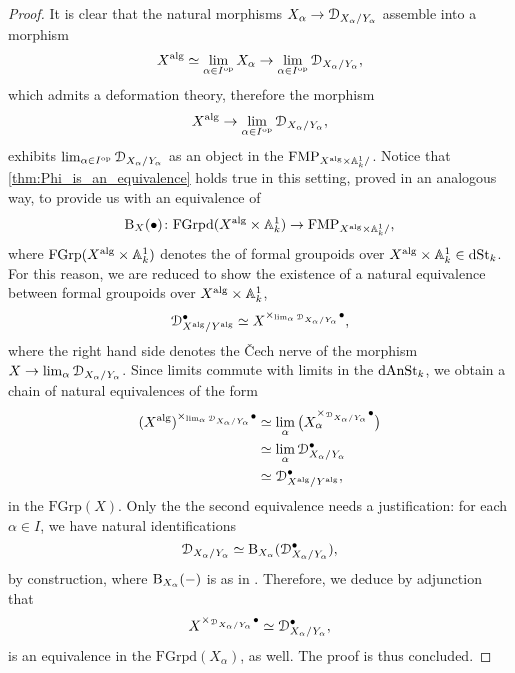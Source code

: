 \documentclass[10pt,a4paper,reqno]{amsart} %
\theoremstyle{plain}
\theoremstyle{definition}
\theoremstyle{remark}
\numberwithin{equation}{section}
\begin{document}
\begin{proof}
    It is clear that the natural morphisms $X_\alpha \to \mathcal D_{X_\alpha/ Y_\alpha}$ assemble into a morphism
        \[
            X ^\mathrm{alg} \simeq \lim_{\alpha \in I^\mathrm{op}} X_\alpha \to \lim_{\alpha \in I^\mathrm{op}} \mathcal D_{X_\alpha/ Y_\alpha},
        \]
    which admits a deformation theory, therefore the morphism 
        \[X^\mathrm{alg} \to \lim_{\alpha \in I^\mathrm{op}} \mathcal D_{X_\alpha/ Y_\alpha},\]
    exhibits $\lim_{\alpha \in I^\mathrm{op}} \mathcal D_{X_\alpha/ Y_\alpha}$ as an object
    in the \infcat $\mathrm{FMP}_{X^\mathrm{alg} \times \mathbb A^1_k/ }$. Notice that \cref{thm:Phi_is_an_equivalence} holds true in this setting, proved in
    an analogous way, to provide us
    with an equivalence of \infcats
        \[  
            \mathrm B_X(\bullet) \colon \mathrm{FGrpd}(X^\mathrm{alg} \times \mathbb A^1_k) \to \mathrm{FMP}_{X^\mathrm{alg} \times \mathbb A^1_k/ },
        \]
    where $\mathrm{FGrp}(X^\mathrm{alg} \times \mathbb A^1_k)$ denotes the \infcat of formal groupoids over $X^\mathrm{alg} \times \mathbb A^1_k \in \mathrm{dSt}_k$. For this reason, we are reduced to show
    the existence of a natural equivalence between formal groupoids over $X^\mathrm{alg} \times \mathbb A^1_k$,
        \[
            \mathcal D_{X^\mathrm{alg}/ Y^\mathrm{alg}}^\bullet \simeq X^{\times_{\lim_\alpha \mathcal D_{X_\alpha/ Y_\alpha}} \bullet},
        \]
    where the right hand side denotes the \v{C}ech nerve of the morphism $X \to \lim_\alpha \mathcal D_{X_\alpha/ Y_\alpha}$.
    Since limits
    commute with limits in the \infcat $\mathrm{dAnSt}_k$, we obtain a chain of natural equivalences of the form
        \begin{align*}
            (X^\mathrm{alg})^{\times_{\lim_{\alpha} \mathcal D_{X_\alpha/ Y_\alpha}}\bullet}    & \simeq \lim_{\alpha } \big(X_\alpha^{\times_{\mathcal D_{X_\alpha/ Y_\alpha}} \bullet} \big) \\
                                                                                & \simeq \lim_{\alpha } \mathcal D_{X_\alpha/ Y_\alpha}^\bullet \\
                                                                                & \simeq \mathcal D_{X^\mathrm{alg}/ Y^\mathrm{alg}}^\bullet,
        \end{align*}
    in the \infcat $\mathrm{FGrp}(X)$. Only the the second equivalence needs a justification:
    for each $\alpha \in I$, we have natural identifications
        \[
            \mathcal D_{X_\alpha/ Y_\alpha} \simeq \mathrm B_{X_\alpha}( \mathcal D_{X_\alpha/ Y_\alpha}^\bullet) , 
        \]
    by construction, where $\mathrm B_{X_\alpha} (-)$ is as in \cite[\S 5.2]{Gaitsgory_Study_II}. Therefore, we deduce by adjunction that
        \[
            X^{\times_{\mathcal D_{X_\alpha/ Y_\alpha} }\bullet} \simeq \mathcal D_{X_\alpha/ Y_\alpha}^\bullet,
        \]
    is an equivalence in the \infcat $\mathrm{FGrpd}(X_\alpha)$, as well. The proof is thus concluded.
\end{proof}
\end{document}
